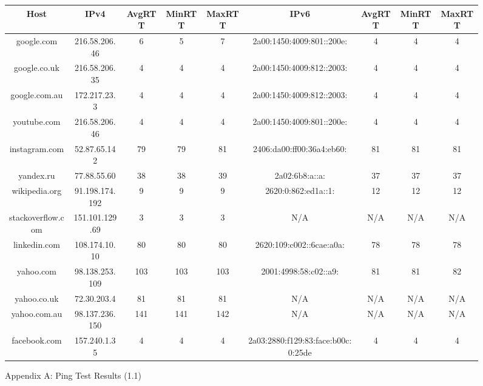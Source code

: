 \begin{sidewaysfigure}
\caption{Appendix A: Ping Test Results (1.1)}
\begin{tabular}{@{}ccccccccc@{}}
\toprule
Host              & IPv4           & AvgRTT & MinRTT & MaxRTT & IPv6                               & AvgRTT & MinRTT & MaxRTT \\ \midrule
google.com        & 216.58.206.46  & 6      & 5      & 7      & 2a00:1450:4009:801::200e:          & 4      & 4      & 4      \\
google.co.uk      & 216.58.206.35  & 4      & 4      & 4      & 2a00:1450:4009:812::2003:          & 4      & 4      & 4      \\
google.com.au     & 172.217.23.3   & 4      & 4      & 4      & 2a00:1450:4009:812::2003:          & 4      & 4      & 4      \\
youtube.com       & 216.58.206.46  & 4      & 4      & 4      & 2a00:1450:4009:801::200e:          & 4      & 4      & 4      \\
instagram.com     & 52.87.65.142   & 79     & 79     & 81     & 2406:da00:ff00:36a4:eb60:          & 81     & 81     & 81     \\
yandex.ru         & 77.88.55.60    & 38     & 38     & 39     & 2a02:6b8:a::a:                     & 37     & 37     & 37     \\
wikipedia.org     & 91.198.174.192 & 9      & 9      & 9      & 2620:0:862:ed1a::1:                & 12     & 12     & 12     \\
stackoverflow.com & 151.101.129.69 & 3      & 3      & 3      & N/A                                & N/A    & N/A    & N/A    \\
linkedin.com      & 108.174.10.10  & 80     & 80     & 80     & 2620:109:c002::6cae:a0a:           & 78     & 78     & 78     \\
yahoo.com         & 98.138.253.109 & 103    & 103    & 103    & 2001:4998:58:c02::a9:              & 81     & 81     & 82     \\
yahoo.co.uk       & 72.30.203.4    & 81     & 81     & 81     & N/A                                & N/A    & N/A    & N/A    \\
yahoo.com.au      & 98.137.236.150 & 141    & 141    & 142    & N/A                                & N/A    & N/A    & N/A    \\
facebook.com      & 157.240.1.35   & 4      & 4      & 4      & 2a03:2880:f129:83:face:b00c:0:25de & 4      & 4      & 4      \\

\end{tabular}
\end{sidewaysfigure}
